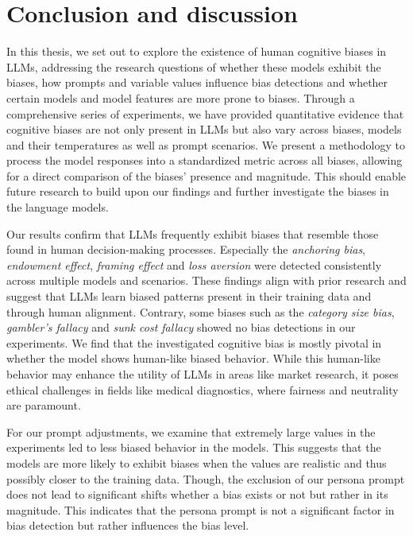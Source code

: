 \section{Conclusion and discussion}
\label{chapter:discussionoutlook}

\par In this thesis, we set out to explore the existence of human cognitive biases in LLMs, addressing the research questions of whether these models exhibit the biases, how prompts and variable values influence bias detections and whether certain models and model features are more prone to biases. Through a comprehensive series of experiments, we have provided quantitative evidence that cognitive biases are not only present in LLMs but also vary across biases, models and their temperatures as well as prompt scenarios. We present a methodology to process the model responses into a standardized metric across all biases, allowing for a direct comparison of the biases' presence and magnitude. This should enable future research to build upon our findings and further investigate the biases in the language models.

\par Our results confirm that LLMs frequently exhibit biases that resemble those found in human decision-making processes. Especially the \textit{anchoring bias}, \textit{endowment effect}, \textit{framing effect} and \textit{loss aversion} were detected consistently across multiple models and scenarios. These findings align with prior research and suggest that LLMs learn biased patterns present in their training data and through human alignment. Contrary, some biases such as the \textit{category size bias}, \textit{gambler's fallacy} and \textit{sunk cost fallacy} showed no bias detections in our experiments. We find that the investigated cognitive bias is mostly pivotal in whether the model shows human-like biased behavior. While this human-like behavior may enhance the utility of LLMs in areas like market research, it poses ethical challenges in fields like medical diagnostics, where fairness and neutrality are paramount.

\par For our prompt adjustments, we examine that extremely large values in the experiments led to less biased behavior in the models. This suggests that the models are more likely to exhibit biases when the values are realistic and thus possibly closer to the training data. Though, the exclusion of our persona prompt does not lead to significant shifts whether a bias exists or not but rather in its magnitude. This indicates that the persona prompt is not a significant factor in bias detection but rather influences the bias level.

